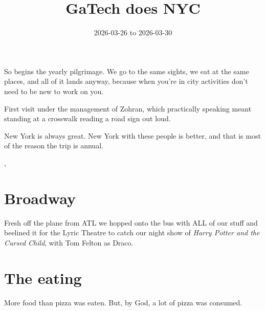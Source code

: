 
\title{GaTech does NYC}
\date{2026-03-26 to 2026-03-30}




So begins the yearly pilgrimage. We go to the same sights, we eat at the same
places, and all of it lands anyway, because when you're in  city activities don't need to be new to
work on you.


First visit under the management of Zohran, which practically speaking meant
standing at a crosswalk reading a road sign out loud. 

New York is always great. New York with these people is better, and that is
most of the reason the trip is annual.

\sep

\section{Broadway}

Fresh off the plane from ATL we hopped onto the bus with ALL of our stuff and
beelined it for the Lyric Theatre to catch our night show of \textit{Harry
Potter and the Cursed Child}, with Tom Felton as Draco.



\section{The eating}

More food than pizza was eaten. But, by God, a lot of pizza was consumed.


